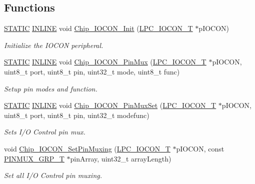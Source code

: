 \subsection*{Functions}
\begin{DoxyCompactItemize}
\item 
\hyperlink{group__LPC__Types__Public__Macros_ga10b2d890d871e1489bb02b7e70d9bdfb}{S\+T\+A\+T\+IC} \hyperlink{group__LPC__Types__Public__Types_ga2eb6f9e0395b47b8d5e3eeae4fe0c116}{I\+N\+L\+I\+NE} void \hyperlink{group__IOCON__17XX__40XX_ga40283d81f5ad91ba8b47647059721c9d}{Chip\+\_\+\+I\+O\+C\+O\+N\+\_\+\+Init} (\hyperlink{structLPC__IOCON__T}{L\+P\+C\+\_\+\+I\+O\+C\+O\+N\+\_\+T} $\ast$p\+I\+O\+C\+ON)
\begin{DoxyCompactList}\small\item\em Initialize the I\+O\+C\+ON peripheral. \end{DoxyCompactList}\item 
\hyperlink{group__LPC__Types__Public__Macros_ga10b2d890d871e1489bb02b7e70d9bdfb}{S\+T\+A\+T\+IC} \hyperlink{group__LPC__Types__Public__Types_ga2eb6f9e0395b47b8d5e3eeae4fe0c116}{I\+N\+L\+I\+NE} void \hyperlink{group__IOCON__17XX__40XX_gaa2f90b2873cda51e67b3a67d6cc92617}{Chip\+\_\+\+I\+O\+C\+O\+N\+\_\+\+Pin\+Mux} (\hyperlink{structLPC__IOCON__T}{L\+P\+C\+\_\+\+I\+O\+C\+O\+N\+\_\+T} $\ast$p\+I\+O\+C\+ON, uint8\+\_\+t port, uint8\+\_\+t pin, uint32\+\_\+t mode, uint8\+\_\+t func)
\begin{DoxyCompactList}\small\item\em Setup pin modes and function. \end{DoxyCompactList}\item 
\hyperlink{group__LPC__Types__Public__Macros_ga10b2d890d871e1489bb02b7e70d9bdfb}{S\+T\+A\+T\+IC} \hyperlink{group__LPC__Types__Public__Types_ga2eb6f9e0395b47b8d5e3eeae4fe0c116}{I\+N\+L\+I\+NE} void \hyperlink{group__IOCON__17XX__40XX_ga5db68254cabb0d4cd4558d81557b77e4}{Chip\+\_\+\+I\+O\+C\+O\+N\+\_\+\+Pin\+Mux\+Set} (\hyperlink{structLPC__IOCON__T}{L\+P\+C\+\_\+\+I\+O\+C\+O\+N\+\_\+T} $\ast$p\+I\+O\+C\+ON, uint8\+\_\+t port, uint8\+\_\+t pin, uint32\+\_\+t modefunc)
\begin{DoxyCompactList}\small\item\em Sets I/O Control pin mux. \end{DoxyCompactList}\item 
void \hyperlink{group__IOCON__17XX__40XX_gad97c96e401016cf296e6d20454f1c522}{Chip\+\_\+\+I\+O\+C\+O\+N\+\_\+\+Set\+Pin\+Muxing} (\hyperlink{structLPC__IOCON__T}{L\+P\+C\+\_\+\+I\+O\+C\+O\+N\+\_\+T} $\ast$p\+I\+O\+C\+ON, const \hyperlink{structPINMUX__GRP__T}{P\+I\+N\+M\+U\+X\+\_\+\+G\+R\+P\+\_\+T} $\ast$pin\+Array, uint32\+\_\+t array\+Length)
\begin{DoxyCompactList}\small\item\em Set all I/O Control pin muxing. \end{DoxyCompactList}\end{DoxyCompactItemize}


